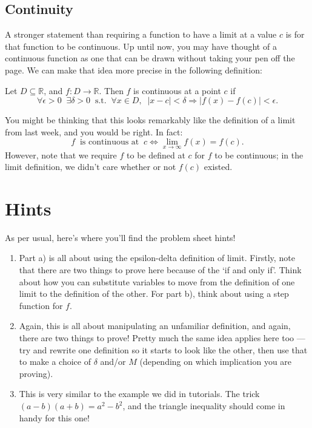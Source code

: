 \documentclass[
  10pt,
  a4paper]{article}
\providecommand{\tightlist}{%
  \setlength{\itemsep}{0pt}\setlength{\parskip}{0pt}}
\theoremstyle{plain}
\theoremstyle{definition}
\theoremstyle{plain}
\theoremstyle{plain}
\theoremstyle{plain}
\theoremstyle{plain}
\theoremstyle{definition}
\theoremstyle{definition}
\theoremstyle{remark}
\theoremstyle{remark}
\let\BeginKnitrBlock\begin \let\EndKnitrBlock\end
\begin{document}
\hypertarget{continuity}{%
\subsection{Continuity}\label{continuity}}

A stronger statement than requiring a function to have a limit at a value \(c\) is for that function to be continuous. Up until now, you may have thought of a continuous function as one that can be drawn without taking your pen off the page. We can make that idea more precise in the following definition:

\BeginKnitrBlock{definition}[Continuity]
{\label{def:def2} }Let \(D \subseteq \mathbb{R}\), and \(f: D \to \mathbb{R}\). Then \(f\) is continuous at a point \(c\) if \[\forall \epsilon > 0\;\;\exists \delta > 0\;\;\text{s.t.}\;\;\forall x \in D,\;\; \lvert x - c \rvert < \delta \Rightarrow \lvert f(x) - f(c) \rvert < \epsilon.\]
\EndKnitrBlock{definition}

You might be thinking that this looks remarkably like the definition of a limit from last week, and you would be right. In fact: \[f\;\;\text{is continuous at}\;\; c \Longleftrightarrow \lim_{x \to \infty}f(x) = f(c).\] However, note that we require \(f\) to be defined at \(c\) for \(f\) to be continuous; in the limit definition, we didn't care whether or not \(f(c)\) existed.

\hypertarget{hints}{%
\section{Hints}\label{hints}}

As per usual, here's where you'll find the problem sheet hints!

\begin{enumerate}
\def\labelenumi{\arabic{enumi})}
\tightlist
\item
  Part a) is all about using the epsilon-delta definition of limit. Firstly, note that there are two things to prove here because of the `if and only if'. Think about how you can substitute variables to move from the definition of one limit to the definition of the other. For part b), think about using a step function for \(f\).
\item
  Again, this is all about manipulating an unfamiliar definition, and again, there are two things to prove! Pretty much the same idea applies here too --- try and rewrite one definition so it starts to look like the other, then use that to make a choice of \(\delta\) and/or \(M\) (depending on which implication you are proving).
\item
  This is very similar to the example we did in tutorials. The trick \((a-b)(a+b) = a^2 - b^2\), and the triangle inequality should come in handy for this one!
\end{enumerate}
\end{document}
